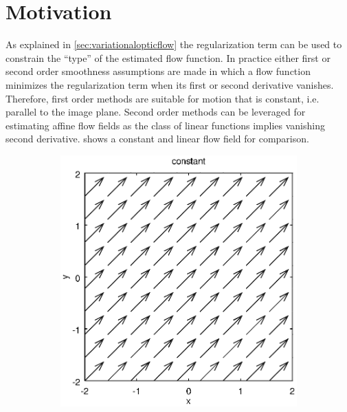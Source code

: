 \documentclass[journal]{vgtc}
\begin{document}
\section{Motivation}\label{sec:motivation}
As explained in \cref{sec:variationalopticflow} the regularization term can be used to constrain the \enquote{type} of the estimated flow function.
In practice either first or second order smoothness assumptions are made in which a flow function minimizes the regularization term when its first or second derivative vanishes.
Therefore, first order methods are suitable for motion that is constant, i.e. parallel to the image plane.
Second order methods can be leveraged for estimating affine flow fields as the class of linear functions implies vanishing second derivative.
 shows a constant and linear flow field for comparison.
\begin{figure}[htb]
\centering
\begin{subfigure}{0.49\linewidth}
\centering
\includegraphics[width=\linewidth]{images/constantflow.eps}
\end{subfigure}
\begin{subfigure}{0.49\linewidth}
\centering

\end{subfigure}
\end{figure}
\end{document}
